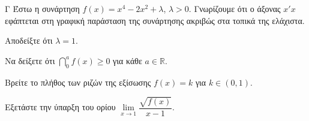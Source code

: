 \begin{thema}{Γ}
Έστω η συνάρτηση $f(x) = x^4 - 2x^2 + \lambda$, $\lambda > 0$. Γνωρίζουμε ότι ο άξονας $x'x$ εφάπτεται στη γραφική παράσταση της συνάρτησης ακριβώς στα τοπικά της ελάχιστα.
\begin{erwthma}
  \item Αποδείξτε ότι $\lambda = 1$.
  \item Να δείξετε ότι $\dint_{0}^{a}f(x) \ge 0$ για κάθε $a\in\mathbb{R}$.
  \item Βρείτε το πλήθος των ριζών της εξίσωσης $f(x) = k$ για $k \in (0, 1)$.
  \item Εξετάστε την ύπαρξη του ορίου $\lim\limits_{x \to 1} \dfrac{\sqrt{f(x)}}{x-1}$.
\end{erwthma}
\end{thema}
